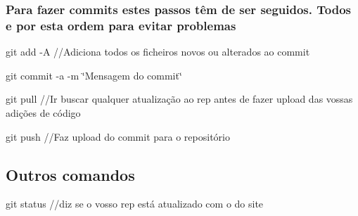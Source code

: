 \subsubsection*{Para fazer commits estes passos têm de ser seguidos. Todos e por esta ordem para evitar problemas}


\begin{DoxyItemize}
\item git add -\/\+A //\+Adiciona todos os ficheiros novos ou alterados ao commit
\item git commit -\/a -\/m \char`\"{}\+Mensagem do commit\char`\"{}
\item git pull //\+Ir buscar qualquer atualização ao rep antes de fazer upload das vossas adições de código
\item git push //\+Faz upload do commit para o repositório
\end{DoxyItemize}

\subsection*{Outros comandos}


\begin{DoxyItemize}
\item git status //diz se o vosso rep está atualizado com o do site 
\end{DoxyItemize}